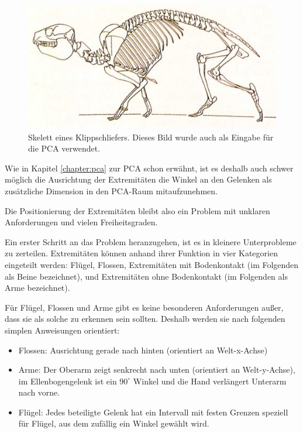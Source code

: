  \begin{figure}
  \centering
  \includegraphics{../PCA/Skelettbilder/Klippschliefer.jpg}
  \caption{Skelett eines Klippschliefers. Dieses Bild wurde auch als Eingabe für die PCA verwendet.}
  \label{klippschliefer}
 \end{figure}

Wie in Kapitel \ref{chapter:pca} zur PCA schon erwähnt, ist es deshalb auch schwer möglich die Ausrichtung der Extremitäten \bzw die Winkel an den Gelenken als zusätzliche Dimension in den PCA-Raum mitaufzunehmen.

Die Positionierung der Extremitäten bleibt also ein Problem mit unklaren Anforderungen und vielen Freiheitsgraden.

Ein erster Schritt an das Problem heranzugehen, ist es in kleinere Unterprobleme zu zerteilen.
Extremitäten können anhand ihrer Funktion in vier Kategorien eingeteilt werden:
Flügel, Flossen, Extremitäten mit Bodenkontakt (im Folgenden als Beine bezeichnet), und Extremitäten ohne Bodenkontakt (im Folgenden als Arme bezeichnet).

Für Flügel, Flossen und Arme gibt es keine besonderen Anforderungen außer, dass sie als solche zu erkennen sein sollten. Deshalb werden sie nach folgenden simplen Anweisungen orientiert:
\begin{itemize}
 \item Flossen: Ausrichtung gerade nach hinten (orientiert an Welt-x-Achse)
 \item Arme: Der Oberarm zeigt senkrecht nach unten (orientiert an Welt-y-Achse), im Ellenbogengelenk ist ein $90^{\circ}$ Winkel und die Hand verlängert Unterarm nach vorne.
 \item Flügel: Jedes beteiligte Gelenk hat ein Intervall mit festen Grenzen speziell für Flügel, aus dem zufällig ein Winkel gewählt wird.
\end{itemize}

